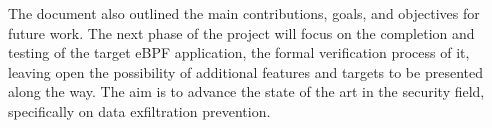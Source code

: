 The document also outlined the main contributions, goals, and objectives for future work. 
The next phase of the project will focus on the completion and testing of the target eBPF application, the formal verification process of it, leaving open the possibility of additional features and targets to be presented along the way. The aim is to advance the state of the art in the security field, specifically on data exfiltration prevention.
\begin{comment}
In addition to these tasks, we may consider incorporating additional features or making improvements to existing features, depending on the results of our research and the progress of our work. The aim is to continue advancing the state of the art in the field of blockchain consensus algorithms, and to provide a comprehensive understanding of the various protocols and tools that are available for improving the performance and efficiency of blockchain networks.


\section{Conclusion}

In conclusion, this project has explored the crucial concepts of in the field of blockchain technology. Through a review of the state of the art, it was revealed that there are several popular consensus algorithms used in blockchain networks, each with its own strengths and weaknesses. The project then identified the challenges in the field of consensus protocols, including the lack of standardization, difficulties in comparison, testing and the fact that there's a multitude of different consensus algorithms available in the field of blockchain technology,
making it difficult for individuals and organizations to adopt blockchain effectively.

The proposed solution was to overcome these challenges by providing a method of testing and easily swapping consensus algorithms in a pre-existing well-tested blockchain network.
The implementation of this solution was tested and proved to be feasible by the execution of the experiment done, demonstrating the versatility and flexibility of the Tezos network in accommodating custom consensus protocols.

The document also outlined the main contributions, goals, and objectives for future work.
The next phase of the project will focus on the completion and testing of the Proof of Work (experiment) protocol implemented in Tezos, development of a generic framework for adding new consensus algorithms, creation of a platform for testing them, integration with the Lupin DSL, and writing of the thesis to present research results and conclusions on the work performed. The aim is to advance the state of the art in blockchain consensus algorithms and provide a comprehensive understanding of available protocols and tools to improve block\-chain network performance and efficiency.





\end{comment}
